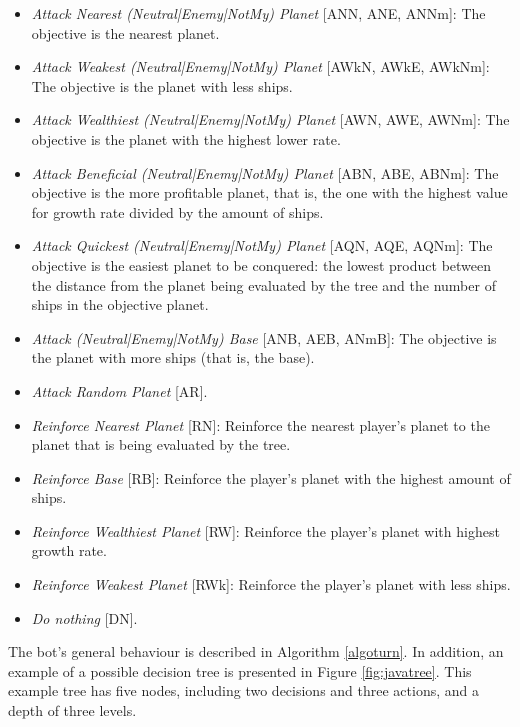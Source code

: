 \documentclass[conference]{IEEEtran}
\begin{document}
\begin{itemize}
\item {\em Attack Nearest (Neutral|Enemy|NotMy) Planet} [ANN, ANE, ANNm]: The objective is the nearest planet.
\item {\em Attack Weakest (Neutral|Enemy|NotMy) Planet} [AWkN, AWkE, AWkNm]: The objective is the planet with less ships.
\item {\em Attack Wealthiest (Neutral|Enemy|NotMy) Planet} [AWN, AWE, AWNm]: The objective is the planet with the highest lower rate.
\item {\em Attack Beneficial (Neutral|Enemy|NotMy) Planet} [ABN, ABE, ABNm]: The objective is the  more profitable planet, that is, the one with the highest value for growth rate divided by the amount of ships.
\item {\em Attack Quickest (Neutral|Enemy|NotMy) Planet} [AQN, AQE, AQNm]: The objective is the easiest planet to be conquered: the lowest product between the distance from the planet being evaluated by the tree and the number of ships in the objective planet.
\item {\em Attack (Neutral|Enemy|NotMy) Base} [ANB, AEB, ANmB]: The objective is the planet with more ships (that is, the base).
\item {\em Attack Random Planet} [AR].
\item {\em Reinforce Nearest Planet} [RN]: Reinforce the nearest player's planet to the planet that is being evaluated by the tree.
\item {\em Reinforce Base} [RB]: Reinforce the player's planet with the highest amount of ships.
\item {\em Reinforce Wealthiest Planet} [RW]: Reinforce the player's planet with highest growth rate.
\item {\em Reinforce Weakest Planet} [RWk]: Reinforce the player's planet with less ships.
\item {\em Do nothing} [DN].

\end{itemize}

The bot's general behaviour is described in Algorithm \ref{algoturn}.
In addition, an example of a possible decision tree is presented in Figure \ref{fig:javatree}. This example tree has five nodes, including two decisions and three actions, and a depth of three levels.
\end{document}
